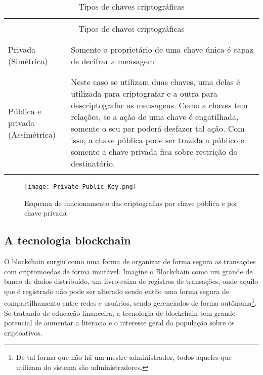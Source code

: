   \begin{table}[H]  
  	\begin{tabular}{|l|p{10cm}|}
  		\hline
  		\multicolumn{2}{|c|}{}\\
  		\multicolumn{2}{|c|}{Tipos de chaves criptográficas} \\
  		\multicolumn{2}{|c|}{}\\
  		\hline
  		&\\
  		Privada (Simétrica) & Somente o proprietário de uma chave única é capaz de decifrar a mensagem\\
  		&\\
  		\hline
  		&\\
  		Pública e privada (Assimétrica) & Neste caso se utilizam duas chaves, uma delas é utilizada para criptografar e a outra para descriptografar as mensagens. Como a chaves tem relações, se a ação de uma chave é engatilhada, somente o seu par poderá desfazer tal ação. Com isso, a chave pública pode ser trazida a público e somente a chave privada fica sobre restrição do destinatário.  \\
  		&\\
  		\hline
  	\end{tabular}
  	\caption{Tipos de chaves criptográficas}
  \end{table}
  
  \begin{figure}[H]
  	\centering
  	\caption{Esquema de funcionamento das criptografias por chave pública e por chave privada}
  	\texttt{[image: Private-Public\_Key.png]}
  	\\	
  \end{figure}

\subsection{A tecnologia blockchain}

O blockchain surgiu como uma forma de organizar de forma segura as transações com criptomoedas de forma imutável. Imagine o Blockchain como um grande de banco de dados distribuído, um livro-caixa de registros de transações, onde aquilo que é registrado não pode ser alterado sendo então uma forma segura de compartilhamento entre redes e usuários, sendo gerenciados de forma autônoma\footnote{De tal forma que não há um mestre administrador, todos aqueles que utilizam do sistema são administradores.}. Se tratando de educação financeira, a tecnologia de blockchain tem grande potencial de aumentar a literacia e o interesse geral da população sobre os criptoativos. 

